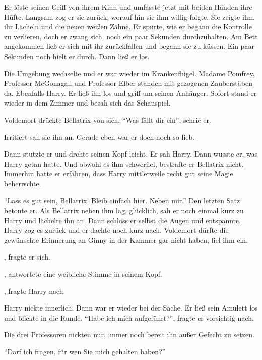 Er löste seinen Griff von ihrem Kinn und umfasste jetzt mit beiden Händen ihre Hüfte. Langsam zog er sie zurück, worauf hin sie ihm willig folgte. Sie zeigte ihm ihr Lächeln und die neuen weißen Zähne. Er spürte, wie er begann die Kontrolle zu verlieren, doch er zwang sich, noch ein paar Sekunden durchzuhalten. Am Bett angekommen ließ er sich mit ihr zurückfallen und begann sie zu küssen. Ein paar Sekunden noch hielt er durch. Dann ließ er los.

Die Umgebung wechselte und er war wieder im Krankenflügel. Madame Pomfrey, Professor McGonagall und Professor Elber standen mit gezogenen Zauberstäben da. Ebenfalls Harry. Er ließ ihn los und griff um seinen Anhänger. Sofort stand er wieder in dem Zimmer und besah sich das Schauspiel.

Voldemort drückte Bellatrix von sich. \enquote{Was fällt dir ein}, schrie er.

Irritiert sah sie ihn an. Gerade eben war er doch noch so lieb.

Dann stutzte er und drehte seinen Kopf leicht. Er sah Harry. Dann wusste er, was Harry getan hatte. Und obwohl es ihm schwerfiel, bestrafte er Bellatrix nicht. Immerhin hatte er erfahren, dass Harry mittlerweile recht gut seine Magie beherrschte.

\enquote{Lass es gut sein, Bellatrix. Bleib einfach hier. Neben mir.} Den letzten Satz betonte er. Als Bellatrix neben ihm lag, glücklich, sah er noch einmal kurz zu Harry und lächelte ihn an. Dann schloss er selbst die Augen und entspannte. Harry zog es zurück und er dachte noch kurz nach. Voldemort dürfte die gewünschte Erinnerung an Ginny in der Kammer gar nicht haben, fiel ihm ein.

, fragte er sich.

, antwortete eine weibliche Stimme in seinem Kopf.

, fragte Harry nach.


Harry nickte innerlich. Dann war er wieder bei der Sache. Er ließ sein Amulett los und blickte in die Runde. \enquote{Habe ich mich aufgeführt?}, fragte er vorsichtig nach.

Die drei Professoren nickten nur, immer noch bereit ihn außer Gefecht zu setzen.

\enquote{Darf ich fragen, für wen Sie mich gehalten haben?}

